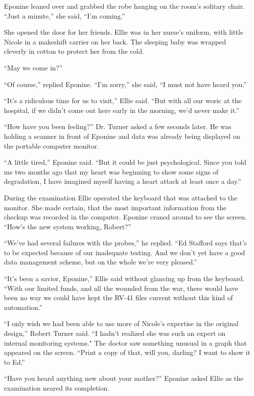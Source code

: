 \documentclass[]{article}
\begin{document}
{{Eponine leaned over and grabbed the robe hanging on the room’s solitary chair.  “Just a minute,” she said, “I’m coming.”

She opened the door for her friends.  Ellie was in her nurse’s uniform, with little Nicole in a makeshift carrier on her back.  The sleeping baby was wrapped cleverly in cotton to protect her from the cold.

“May we come in?”

“Of course,” replied Eponine.  “I’m sorry,” she said, “I must not have heard you.”

“It’s a ridiculous time for us to visit,” Ellie said.  “But with all our woric at the hospital, if we didn’t come out here early in the morning, we’d never make it.”

“How have you been feeling?” Dr.  Turner asked a few seconds later.  He was holding a scanner in front of Eponine and data was already being displayed on the portable computer monitor.

“A little tired,” Eponine said.  “But it could be just psychological.  Since you told me two months ago that my heart was beginning to show some signs of degradation, I have imagined myself having a heart attack at least once a day.”

During the examination Ellie operated the keyboard that was attached to the monitor.  She made certain, that the most important information from the checkup was recorded in the computer.  Eponine craned around to see the screen.  “How’s the new system working, Robert?”

“We’ve had several failures with the probes,” he replied.  “Ed Stafford says that’s to be expected because of our inadequate testing.  And we don’t yet have a good data management scheme, but on the whole we’re very pleased.”

“It’s been a savior, Eponine,” Ellie said without glancing up from the keyboard.  “With our limited funds, and all the wounded from the war, there would have been no way we could have kept the RV-41 files current without this kind of automation.”

“I only wish we had been able to use more of Nicole’s expertise in the original design,” Robert Turner said.  “I hadn’t realized she was such an expert on internal monitoring systems."  The doctor saw something unusual in a graph that appeared on the screen.  “Print a copy of that, will you, darling? I want to show it to Ed.”

“Have you heard anything new about your mother?” Eponine asked Ellie as the examination neared its completion.

}}
\end{document}
